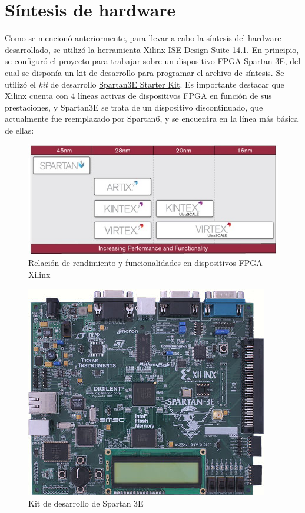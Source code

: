 \newpage

\section{Síntesis de hardware}

Como se mencionó anteriormente, para llevar a cabo la síntesis del hardware desarrollado, se utilizó la herramienta Xilinx ISE Design Suite 14.1. En principio, se configuró el proyecto para trabajar sobre un dispositivo FPGA Spartan 3E, del cual se disponía un kit de desarrollo para programar el archivo de síntesis. Se utilizó el \textit{kit} de desarrollo \href{http://www.xilinx.com/products/boards-and-kits/hw-spar3e-sk-us-g.html}{Spartan3E Starter Kit}. Es importante destacar que Xilinx cuenta con 4 líneas activas de dispositivos FPGA en función de sus prestaciones, y Spartan3E se trata de un dispositivo discontinuado, que actualmente fue reemplazado por Spartan6, y se encuentra en la línea más básica de ellas:

\begin{figure}[!h]
  \begin{center}
    \includegraphics[width=8 cm]{./figures/C05-xilinx_products}
    \caption{Relación de rendimiento y funcionalidades en dispositivos FPGA Xilinx}
    \label{fig:xilinx_products}
  \end{center}
\end{figure}

\begin{figure}[!h]
  \begin{center}
    \includegraphics[width=8 cm]{./figures/C05-spartan3E_starter_kit}
    \caption{Kit de desarrollo de Spartan 3E}
    \label{fig:spartan3E_starter_kit}
  \end{center}
\end{figure}

